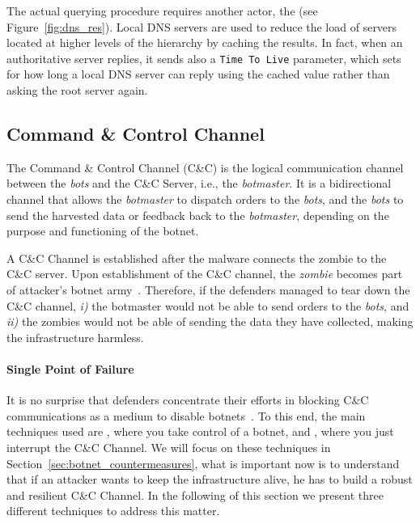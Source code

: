 The actual querying procedure requires another actor, the  (see Figure~\ref{fig:dns_res}).
Local DNS servers are used to reduce the load of servers located at higher levels of
the hierarchy by caching the results. In fact, when an authoritative server replies,
it sends also a \texttt{Time To Live} parameter, which sets for how
long a local DNS server can reply using the cached value rather than asking the root server
again.


\subsection{Command \& Control Channel} %
\label{sub:c_and_c_channel}
The Command \& Control Channel (C\&C) is the logical communication channel
between the \emph{bots} and the C\&C Server, i.e., the \emph{botmaster}.
It is a bidirectional channel that allows the \emph{botmaster} to dispatch orders
to the \emph{bots}, and the \emph{bots} to send the harvested data or feedback
back to the \emph{botmaster}, depending on the purpose and functioning of
the botnet.

A C\&C Channel is established after the malware connects the zombie to the
C\&C server. Upon establishment of the C\&C channel, the \emph{zombie} becomes part of
attacker's botnet army~\cite{feily2009}. Therefore, if the defenders managed
to tear down the C\&C channel, \emph{i)} the botmaster would not be able
to send orders to the \emph{bots}, and \emph{ii)} the zombies would not be able of sending
the data they have collected, making the infrastructure harmless.

\paragraph{Single Point of Failure} %
\label{par:single_point_of_failure}
It is no surprise that defenders concentrate their efforts in blocking
C\&C communications as a medium to disable botnets~\cite{schiavoni2013}. To this end,
the main techniques used are
, where you take control of a botnet, and ,
where you just interrupt the C\&C Channel. We will focus on these techniques in
Section~\ref{sec:botnet_countermeasures}, what is important now is to understand that if an
attacker wants to keep the infrastructure alive, he has to build a robust and
resilient C\&C Channel. In the following of this section we present three different
techniques to address this matter.

